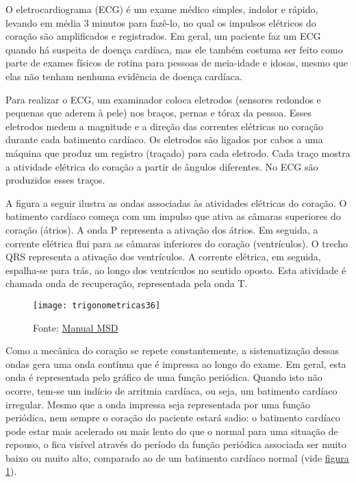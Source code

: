 \needspace{15em}
\begin{knowledge}
\label{trig-knowledge2}


O eletrocardiograma (ECG) é um exame médico simples, indolor e rápido, levando em média 3 minutos para fazê-lo, no qual os impulsos elétricos do coração são amplificados e registrados. Em geral, um paciente faz um ECG quando há suspeita de doença cardíaca, mas ele também costuma ser feito como parte de exames físicos de rotina para pessoas de meia-idade e idosas, mesmo que elas não tenham nenhuma evidência de doença cardíaca.

Para realizar o ECG, um examinador coloca eletrodos (sensores redondos e pequenas que aderem à pele) nos braços, pernas e tórax da pessoa. Esses eletrodos medem a magnitude e a direção das correntes elétricas no coração durante cada batimento cardíaco. Os eletrodos são ligados por cabos a uma máquina que produz um registro (traçado) para cada eletrodo. Cada traço mostra a atividade elétrica do coração a partir de ângulos diferentes. No ECG são produzidos esses traços.

A figura a seguir ilustra as ondas associadas às atividades elétricas do coração. O batimento cardíaco começa com um impulso que ativa as câmaras superiores do coração (átrios). A onda P representa a ativação dos átrios. Em seguida, a corrente elétrica flui para as câmaras inferiores do coração (ventrículos). O trecho QRS representa a ativação dos ventrículos. A corrente elétrica, em seguida, espalha-se para trás, ao longo dos ventrículos no sentido oposto. Esta atividade é chamada onda de recuperação, representada pela onda T.



\begin{figure}[H]
\centering

\texttt{[image: trigonometricas36]}
\caption{Fonte: \href{https://www.msdmanuals.com/pt/casa/dist\%C3\%BArbios-do-cora\%C3\%A7\%C3\%A3o-e-dos-vasos-sangu\%C3\%ADneos/diagn\%C3\%B3stico-de-dist\%C3\%BArbios-do-cora\%C3\%A7\%C3\%A3o-e-dos-vasos-sangu\%C3\%ADneos/eletrocardiograma}{Manual MSD}}
\label{eletrocardiograma}
\end{figure}

Como a mecânica do coração se repete constantemente, a sistematização dessas ondas gera uma onda contínua que é impressa ao longo do exame. Em geral, esta onda é representada pelo gráfico de uma função periódica. Quando isto não ocorre, tem-se um indício de arritmia cardíaca, ou seja, um batimento cardíaco irregular.
Mesmo que a onda impressa seja representada por uma função periódica, nem sempre o coração do paciente estará sadio: o batimento cardíaco pode estar mais acelerado ou mais lento do que o normal para uma situação de repouso, o fica visível através do período da função periódica associada ser muito baixo ou muito alto, comparado ao de um batimento cardíaco normal (vide \hyperref[eletrocardiograma]{figura \ref{eletrocardiograma}}).


\end{knowledge}
\clearpage

